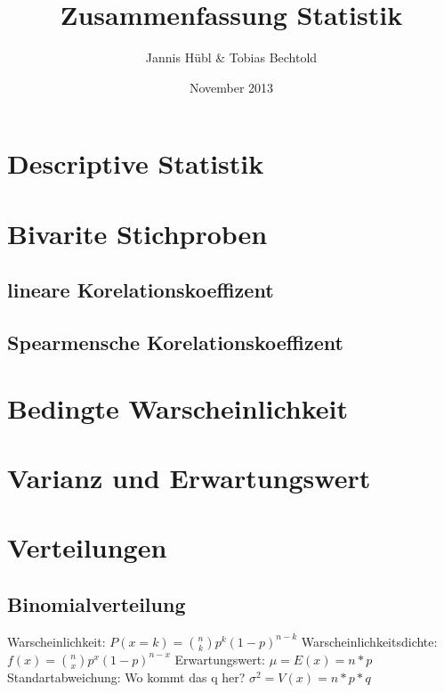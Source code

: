 \documentclass[a4paper, 11pt]{article}
\author{Jannis Hübl & Tobias Bechtold}
\title{Zusammenfassung Statistik}
\date{November 2013}
\begin{document}
\maketitle
\newpage
\tableofcontents

\section{Descriptive Statistik}
\section{Bivarite Stichproben}
\subsection{lineare Korelationskoeffizent}
\subsection{Spearmensche Korelationskoeffizent}
\section{Bedingte Warscheinlichkeit}
\section{Varianz und Erwartungswert}
\section{Verteilungen}
\subsection{Binomialverteilung}
Warscheinlichkeit:
\newline $P(x=k) = \binom{n}{k} p^k (1-p)^{n-k}$
\newline\newline Warscheinlichkeitsdichte:
\newline $f(x) = \binom{n}{x} p^x(1-p)^{n-x}$
\newline\newline Erwartungswert:
\newline $\mu = E(x) = n * p$
\newline\newline Standartabweichung:
Wo kommt das q her?
\newline $\sigma^2 = V(x)= n * p * q$
\end{document}
